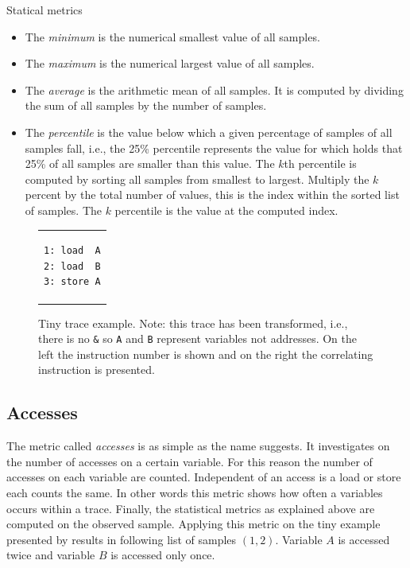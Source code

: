 \documentclass[onecolumn, openright, master, english, signatures]{dbrgrptt}
\begin{document}
\begin{remark} Statical metrics\
\begin{itemize}
\item The \emph{minimum} is the numerical smallest value of all samples.
\item The \emph{maximum} is the numerical largest value of all samples.
\item The \emph{average} is the arithmetic mean of all samples. It is computed by dividing the sum of all samples by the number of samples.
\item The \emph{percentile} is the value below which a given percentage of samples of all samples fall, i.e., the 25\% percentile represents the value for which holds that 25\% of all samples are smaller than this value. The $k$th percentile is computed by sorting all samples from smallest to largest. Multiply the $k$ percent by the total number of values, this is the index within the sorted list of samples. The $k$ percentile is the value at the computed index.
\end{itemize}
\end{remark}

\begin{figure}[!ht]
  \centering
  \begin{tabular}{c}
  \begin{lstlisting}
1: load  A
2: load  B
3: store A
  \end{lstlisting}
  \end{tabular}
  \caption{Tiny \ac{trace} example. Note: this trace has been transformed, i.e., there is no \texttt{\&} so \texttt{A} and \texttt{B} represent variables not addresses. On the left the instruction number is shown and on the right the correlating instruction is presented.}
  \label{fig:metrics-exmaple}
\end{figure}

\subsection{Accesses}\label{ssec:metric-accesses}
The metric called \emph{accesses} is as simple as the name suggests. It investigates on the number of accesses on a certain variable. For this reason the number of accesses on each variable are counted. Independent of an access is a load or store each counts the same. In other words this metric shows how often a variables occurs within a \ac{trace}. Finally, the statistical metrics as explained above are computed on the observed sample. Applying this metric on the tiny example presented by  results in following list of samples $(1, 2)$. Variable $A$ is accessed twice and variable $B$ is accessed only once.
\end{document}
